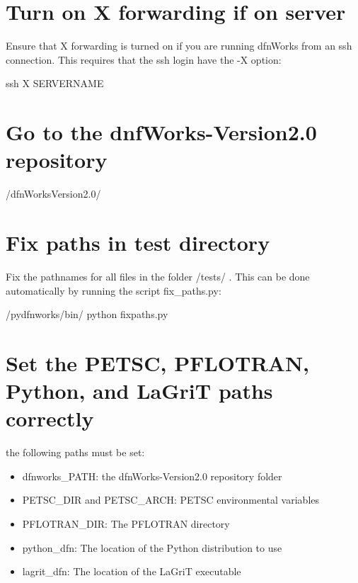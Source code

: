 \documentclass[letterpaper,10pt,english]{sphinxmanual}
\begin{document}
\section{Turn on X forwarding if on server}
\label{\detokenize{tutorial:turn-on-x-forwarding-if-on-server}}
Ensure that X forwarding is turned on if you are running dfnWorks from an ssh connection. This requires that the ssh login have the -X option:

\begin{sphinxVerbatim}[commandchars=\\\{\}]
\PYGZdl{} ssh \PYGZhy{}X SERVER\PYGZus{}NAME
\end{sphinxVerbatim}


\section{Go to the dnfWorks-Version2.0 repository}
\label{\detokenize{tutorial:go-to-the-dnfworks-version2-0-repository}}
\begin{sphinxVerbatim}[commandchars=\\\{\}]
\PYGZdl{}  \PYGZti{}/dfnWorks\PYGZhy{}Version2.0/
\end{sphinxVerbatim}


\section{Fix paths in test directory}
\label{\detokenize{tutorial:fix-paths-in-test-directory}}
Fix the pathnames for all files in the folder /tests/ . This can be done automatically by running the script fix\_paths.py:

\begin{sphinxVerbatim}[commandchars=\\\{\}]
\PYGZdl{}  /pydfnworks/bin/
\PYGZdl{} python fix\PYGZus{}paths.py
\end{sphinxVerbatim}


\section{Set the PETSC, PFLOTRAN, Python, and LaGriT paths correctly}
\label{\detokenize{tutorial:set-the-petsc-pflotran-python-and-lagrit-paths-correctly}}
 the following paths must be set:
\begin{itemize}
\item {} 
dfnworks\_PATH: the dfnWorks-Version2.0 repository folder

\item {} 
PETSC\_DIR and PETSC\_ARCH: PETSC environmental variables

\item {} 
PFLOTRAN\_DIR: The PFLOTRAN directory

\item {} 
python\_dfn: The location of the Python distribution to use

\item {} 
lagrit\_dfn: The location of the LaGriT executable

\end{itemize}
\end{document}

